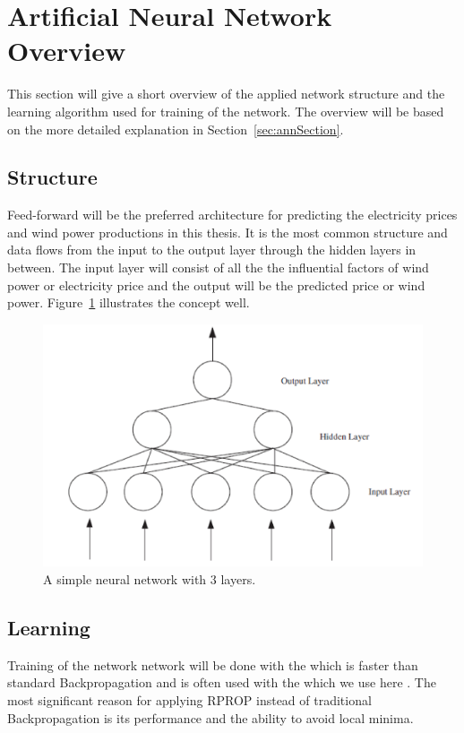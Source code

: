 \section{Artificial Neural Network Overview}
This section will give a short overview of the applied network structure and the learning algorithm used for training of the network. The overview will be based on the more detailed explanation in Section~\ref{sec:annSection}.

\subsection{Structure}
Feed-forward will be the preferred architecture for predicting the electricity prices and wind power productions in this thesis. It is the most common structure and data flows from the input to the output layer through the hidden layers in between. The input layer will consist of all the the influential factors of wind power or electricity price and the output will be the predicted price or wind power. Figure~\ref{fig:overviewAnn} illustrates the concept well.

\begin{figure}[H]
\centering
\includegraphics[width=0.8\linewidth]{billeder/ANN.png}
\caption{A simple neural network with 3 layers. \cite{stockForecasting}}
\label{fig:overviewAnn}
\end{figure}

\subsection{Learning}
Training of the network network will be done with the  which is faster than standard Backpropagation \cite{15} and is often used with the  which we use here \cite{17}. The most significant reason for applying RPROP instead of traditional Backpropagation is its performance and the ability to avoid local minima.

